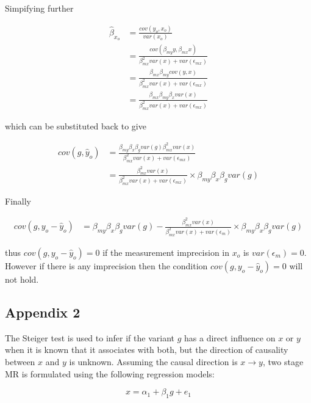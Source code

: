 \documentclass[]{article}
\begin{document}
Simpifying further

\[
\begin{aligned}
\hat{\beta}_{x_o} & = \frac{cov(y_o, x_o)} {var(x_o)} \\
                  & = \frac{cov(\beta_{my} y, \beta_{mx} x)} {\beta_{mx}^2 var(x) + var(\epsilon_{mx})} \\
                  & = \frac{\beta_{mx} \beta_{my} cov(y, x)} {\beta_{mx}^2 var(x) + var(\epsilon_{mx})} \\
                  & = \frac{\beta_{mx} \beta_{my} \beta_x var(x)} {\beta_{mx}^2 var(x) + var(\epsilon_{mx})}
\end{aligned}
\]

which can be substituted back to give

\[
\begin{aligned}
cov(g, \hat{y}_o) & = \frac{\beta_{my} \beta_x \beta_g var(g) \beta_{mx}^2 var(x)} {\beta_{mx}^2 var(x) + var(\epsilon_{mx})} \\
                  & = \frac{\beta_{mx}^2 var(x)} {\beta_{mx}^2 var(x) + var(\epsilon_{mx})} \times \beta_{my} \beta_x \beta_g var(g)
\end{aligned}
\]

Finally

\[
\begin{aligned}
cov(g, y_o - \hat{y}_o) & = \beta_{my} \beta_x \beta_g var(g) - \frac{\beta_{mx}^2 var(x)} {\beta_{mx}^2 var(x) + var(\epsilon_m)} \times \beta_{my} \beta_x \beta_g var(g)
\end{aligned}
\]

thus \(cov(g, y_o - \hat{y}_o) = 0\) if the measurement imprecision in
\(x_o\) is \(var(\epsilon_m) = 0\). However if there is any imprecision
then the condition \(cov(g, y_o - \hat{y}_o) = 0\) will not hold.

\newpage

\subsection{Appendix 2}\label{appendix-2}

The Steiger test is used to infer if the variant \(g\) has a direct
influence on \(x\) or \(y\) when it is known that it associates with
both, but the direction of causality between \(x\) and \(y\) is unknown.
Assuming the causal direction is \(x \to y\), two stage MR is formulated
using the following regression models:

\[
x = \alpha_1 + \beta_1 g + e_1
\]
\end{document}
